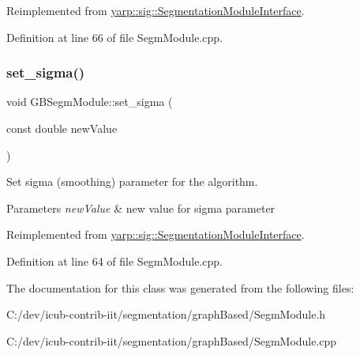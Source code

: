 Reimplemented from \mbox{\hyperlink{classyarp_1_1sig_1_1SegmentationModuleInterface_ad9d90ed7e362ae83e2145445a9c4301e}{yarp\+::sig\+::\+Segmentation\+Module\+Interface}}.



Definition at line 66 of file Segm\+Module.\+cpp.


\begin{DoxyCode}{0}

\end{DoxyCode}
\mbox{\label{classGBSegmModule_a27ffe08d394d321d9f9441423d36ef5e}} 
\subsubsection{\texorpdfstring{set\_sigma()}{set\_sigma()}}
{\footnotesize\ttfamily void G\+B\+Segm\+Module\+::set\+\_\+sigma (\begin{DoxyParamCaption}\item[{const double}]{new\+Value }\end{DoxyParamCaption})\hspace{0.3cm}{\ttfamily [virtual]}}



Set sigma (smoothing) parameter for the algorithm. 


\begin{DoxyParams}{Parameters}
{\em new\+Value} & new value for sigma parameter \\
\hline
\end{DoxyParams}


Reimplemented from \mbox{\hyperlink{classyarp_1_1sig_1_1SegmentationModuleInterface_a68f28930df5e930934c0ee56ad1f680c}{yarp\+::sig\+::\+Segmentation\+Module\+Interface}}.



Definition at line 64 of file Segm\+Module.\+cpp.


\begin{DoxyCode}{0}

\end{DoxyCode}


The documentation for this class was generated from the following files\+:\begin{DoxyCompactItemize}
\item 
C\+:/dev/icub-\/contrib-\/iit/segmentation/graph\+Based/Segm\+Module.\+h\item 
C\+:/dev/icub-\/contrib-\/iit/segmentation/graph\+Based/Segm\+Module.\+cpp\end{DoxyCompactItemize}

